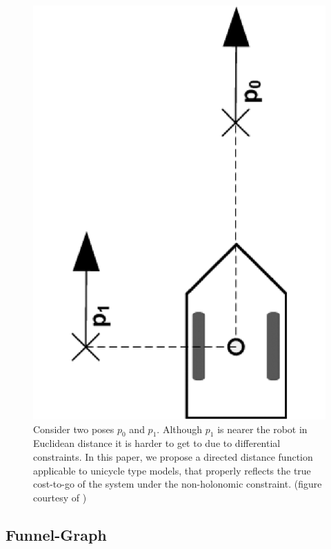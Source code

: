 \begin{figure}
  \centering
  \includegraphics[scale=.2,angle=-90]{figures/rrtfunnel/non-holonomic-vehicle-euclidean-weakness}
  \caption{Consider two poses \(p_0\) and \(p_1\). Although \(p_1\) is nearer
    the robot in Euclidean distance it is harder to get to due to differential
    constraints. In this paper, we propose a directed distance function
    applicable to unicycle type models, that properly reflects the true
    cost-to-go of the system under the non-holonomic constraint. (figure
    courtesy of \cite{parkFeedbackMotionPlanning2015})}
  \label{fig:non-holonomic-vehicle-euclidean-weakness}
\end{figure}


\subsection{Funnel-Graph}

